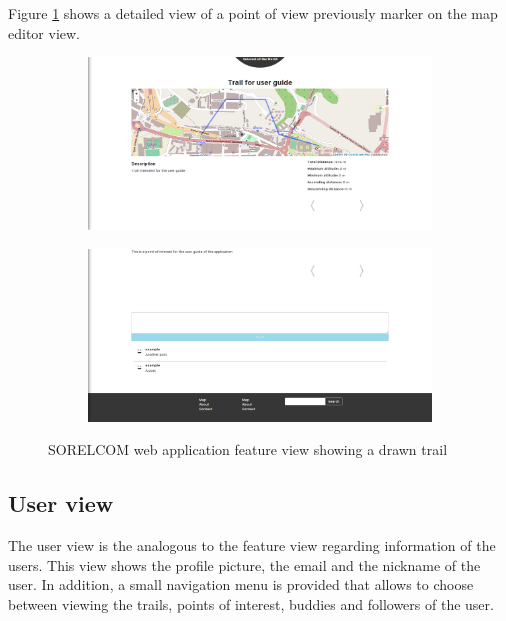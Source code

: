 Figure \ref{fig:feature-view} shows a detailed view of a point of view previously marker on the map editor view.

\begin{figure}[ht]
  \centering
  \begin{subfigure}{.45\textwidth}
    \centering
    \includegraphics[width=.9\textwidth]{fig/trail-view}
  \end{subfigure}
  \begin{subfigure}{.45\textwidth}
    \centering
    \includegraphics[width=.9\textwidth]{fig/post-view}
  \end{subfigure}  
  \caption{SORELCOM web application feature view showing a drawn trail}
  \label{fig:feature-view}
\end{figure} 

\subsection{User view}

The user view is the analogous to the feature view regarding information of the users. This view shows the profile picture, the email and the nickname of the user. In addition, a small navigation menu is provided that allows to choose between viewing the trails, points of interest, buddies and followers of the user.

